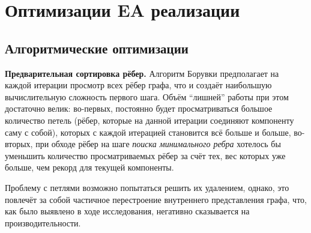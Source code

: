 \documentclass[a4paper,10pt]{extarticle}
\begin{document}



\newpage
\section{Оптимизации EA реализации}
\label{sec:eaopt}

\subsection{Алгоритмические оптимизации}
\label{subsec:optAlgo}

\textbf{Предварительная сортировка рёбер.}
Алгоритм Борувки предполагает на каждой итерации просмотр всех рёбер графа, что и создаёт наибольшую вычислительную сложность первого шага.
Объём ``лишней'' работы при этом достаточно велик: во-первых, постоянно будет просматриваться большое количество петель (рёбер, которые на данной итерации соединяют компоненту саму с собой), которых с каждой итерацией становится всё больше и больше, во-вторых, при обходе рёбер на шаге \textit{поиска минимального ребра} хотелось бы уменьшить количество просматриваемых рёбер за счёт тех, вес которых уже больше, чем рекорд для текущей компоненты.

Проблему с петлями возможно попытаться решить их удалением, однако, это повлечёт за собой частичное перестроение внутреннего представления графа, что, как было выявлено в ходе исследования, негативно сказывается на производительности.
\end{document}
